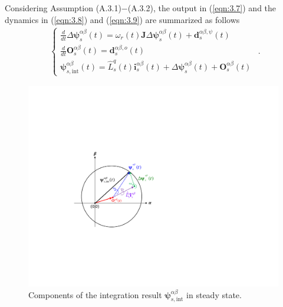 Considering Assumption (A.3.1)$-$(A.3.2), the output in (\ref{eqn:3.7}) and the dynamics in (\ref{eqn:3.8}) and (\ref{eqn:3.9}) are summarized as follows
\begin{equation}
\begin{aligned}\label{eqn:3.10}
\begin{cases}
\frac{d}{dt}{\Delta \boldsymbol{\psi}}^{\alpha\beta}_s(t) = \omega_r(t) \mathbf{J} \Delta \boldsymbol{\psi}^{\alpha\beta}_s(t) + \mathbf{d}^{\alpha\beta,\psi}_{s}(t) \\
\frac{d}{dt}{\mathbf{O}}^{\alpha\beta}_s(t) = \mathbf{d}^{\alpha\beta,o}_{s}(t) \\
\boldsymbol{\psi}^{\alpha\beta}_{s,\text{int}}(t) = \hat{L}^q_s(t) \mathbf{i}^{\alpha\beta}_s(t) + 
\Delta \boldsymbol{\psi}^{\alpha \beta}_s(t) + \mathbf{O}^{\alpha\beta}_s(t)
\end{cases}
\end{aligned}.
\end{equation}
\begin{figure}[t]
    \centering
\includegraphics[scale=0.50]{chapters/Fig3.1a.pdf}
    \caption{Components of the integration result $\boldsymbol{\psi}^{\alpha\beta}_{s,\text{int}}$ in steady state.}
    \label{Fig:3.1a}
\end{figure}

